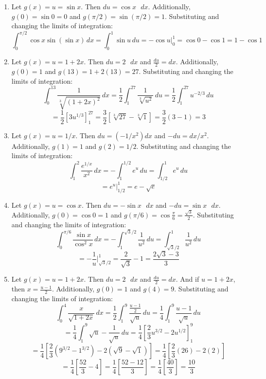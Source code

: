 \begin{Answer}[ref = u_def]
\begin{enumerate}
    \item Let $g(x) = u = \sin{x}$. Then $du = \cos{x} \text{ }dx$. 
    Additionally, $g(0) = \sin{0} = 0$ and $g(\pi/2) = \sin{\left( \pi / 2 
    \right)} = 1$. Substituting and changing the limits of integration:
    $$\int_0^{\pi / 2} \cos{x} \sin{ \left( \sin{x} \right) }\,dx = \int_0^1 
    \sin{u}\,du = -\cos{u}|_0^1 = \cos{0} - \cos{1} = 1 - \cos{1}$$

    \item Let $g(x) = u = 1 + 2x$. Then $du = 2 \text{ }dx$ and $\frac{du}{2} 
    = dx$. Additionally, $g(0) = 1$ and $g(13) = 1 + 2(13) = 27$. Substituting 
    and changing the limits of integration:
    $$\int_0^{13} \frac{1}{\sqrt[3]{\left( 1 + 2x \right)^2}}\,dx = \frac{1}{2}
    \int_1^{27} \frac{1}{\sqrt[3]{u^2}}\,du = \frac{1}{2} \int_1^{27} u^{-2/3}
    \,du$$
    $$= \frac{1}{2} \left[ 3u^{1/3} \right]_1^{27} = \frac{3}{2} \left[ 
    \sqrt[3]{27} - \sqrt[3]{1} \right] = \frac{3}{2} \left( 3 - 1 \right) = 3$$

    \item Let $g(x) = u = 1 / x$. Then $du = (-1 / x^2) dx$ and $-du = dx / 
    x^2$. Additionally, $g(1) = 1$ and $g(2) = 1 / 2$. Substituting and 
    changing the limits of integration:
    $$\int_1^2 \frac{e^{1/x}}{x^2}\,dx = -\int_1^{1/2} e^u\,du = \int_{1/2}^1 
    e^u\,du$$
    $$= e^u|_{1/2}^1 = e - \sqrt{e}$$

    \item Let $g(x) = u = \cos{x}$. Then $du = -\sin{x} \text{ } dx$ and $-du 
    = \sin{x} \text{ }dx$. Additionally, $g(0) = \cos{0} = 1$ and $g(\pi / 6) 
    = \cos{ \frac{\pi}{6}} = \frac{\sqrt{3}}{2}$. Substituting and changing 
    the limits of integration:
    $$\int_0^{\pi / 6} \frac{\sin{x}}{\cos^2{x}}\,dx = -\int_{1}^{\sqrt{3} 
    / 2} \frac{1}{u^2}\,du = \int_{\sqrt{3} / 2}^1 \frac{1}{u^2}\,du$$
    $$= -\frac{1}{u}|_{\sqrt{3} / 2}^1 = \frac{2}{\sqrt{3}} - 1 = \frac{2
    \sqrt{3} - 3}{3}$$

    \item Let $g(x) = u = 1 + 2x$. Then $du = 2 \text{ }dx$ and $\frac{du}{2} 
    = dx$. And if $u = 1 + 2x$, then $x = \frac{u - 1}{2}$. Additionally, 
    $g(0) = 1$ and $g(4) = 9$. Substituting and changing the limits of 
    integration:
    $$\int_0^4 \frac{x}{\sqrt{1 + 2x}}\,dx = \frac{1}{2} \int_1^9 \frac{
    \frac{u-1}{2}}{\sqrt{u}}\,du = \frac{1}{4} \int_1^9 \frac{u - 1}{\sqrt{u}}
    \,du$$
    $$= \frac{1}{4} \int_1^9 \sqrt{u} - \frac{1}{\sqrt{u}}\,du = \frac{1}{4} 
    \left[ \frac{2}{3}u^{3/2} - 2u^{1/2} \right]_1^9$$
    $$= \frac{1}{4} \left[ \frac{2}{3} \left( 9^{3/2} - 1^{3/2} \right) - 2 
    \left( \sqrt{9} - \sqrt{1} \right) \right] = \frac{1}{4} \left[ \frac{2}{3} 
    \left( 26 \right) - 2 \left( 2 \right) \right]$$
    $$= \frac{1}{4} \left[ \frac{52}{3} - 4 \right] = \frac{1}{4} \left[ 
    \frac{52 - 12}{3} \right] = \frac{1}{4} \left[ \frac{40}{3} \right] = 
    \frac{10}{3}$$
\end{enumerate}
\end{Answer}

